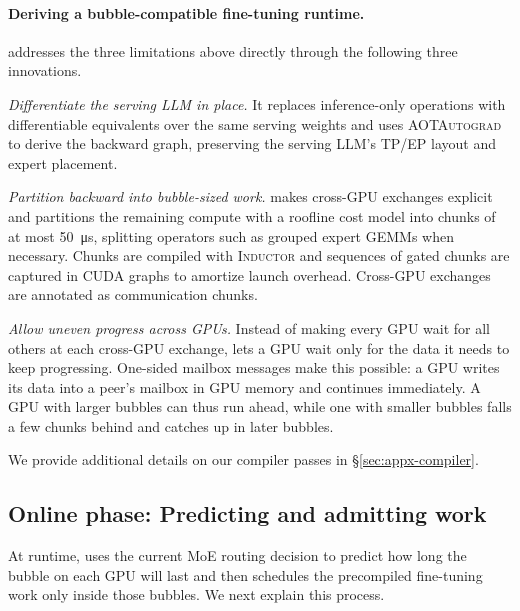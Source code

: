 \paragraph{Deriving a bubble-compatible fine-tuning runtime.}
\sys{} addresses the three limitations above directly through the following three innovations.
\begin{enumerate*}[label=(\roman*)]
    \item \emph{Differentiate the serving \ac{LLM} in place.}
    It replaces inference-only operations with differentiable equivalents over the same serving weights and uses \textsc{AOTAutograd} to derive the backward graph, preserving the serving \ac{LLM}'s \ac{TP}/\ac{EP} layout and expert placement.
    \item \emph{Partition backward into bubble-sized work.}
    \sys makes cross-GPU exchanges explicit and partitions the remaining compute with a roofline cost model into chunks of at most \SI{50}{\micro\second}, splitting operators such as grouped expert \acp{GEMM} when necessary.
    Chunks are compiled with \textsc{Inductor} and sequences of gated chunks are captured in CUDA graphs to amortize launch overhead.
    Cross-GPU exchanges are annotated as communication chunks.
    \item \emph{Allow uneven progress across GPUs.}
    Instead of making every GPU wait for all others at each cross-GPU exchange, \sys lets a GPU wait only for the data it needs to keep progressing.
    One-sided mailbox messages make this possible: a GPU writes its data into a peer's mailbox in GPU memory and continues immediately.
    A GPU with larger bubbles can thus run ahead, while one with smaller bubbles falls a few chunks behind and catches up in later bubbles.
\end{enumerate*}
We provide additional details on our compiler passes in \S\ref{sec:appx-compiler}.

\subsection{Online phase: Predicting and admitting work}
\label{sec:design-window}

At runtime, \sys uses the current \ac{MoE} routing decision to predict how long the bubble on each GPU will last and then schedules the precompiled fine-tuning work only inside those bubbles.
We next explain this process.


